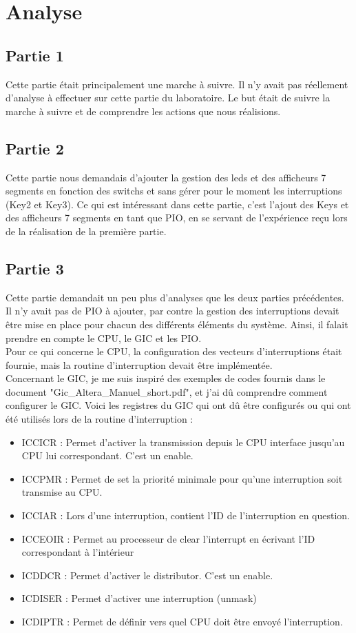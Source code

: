 \section{Analyse}

\subsection{Partie 1}
Cette partie était principalement une marche à suivre. Il n'y avait pas réellement d'analyse à effectuer sur cette partie du laboratoire. Le but était de suivre la marche à suivre et de comprendre les actions que nous réalisions.
\subsection{Partie 2}
Cette partie nous demandais d'ajouter la gestion des leds et des afficheurs 7 segments en fonction des switchs et sans gérer pour le moment les interruptions (Key2 et Key3). Ce qui est intéressant dans cette partie, c'est l'ajout des Keys et des afficheurs 7 segments en tant que PIO, en se servant de l'expérience reçu lors de la réalisation de la première partie.
\subsection{Partie 3}
Cette partie demandait un peu plus d'analyses que les deux parties précédentes. Il n'y avait pas de PIO à ajouter, par contre la gestion des interruptions devait être mise en place pour chacun des différents éléments du système. Ainsi, il falait prendre en compte le CPU, le GIC et les PIO.\\ Pour ce qui concerne le CPU, la configuration des vecteurs d'interruptions était fournie, mais la routine d'interruption devait être implémentée.\\ Concernant le GIC, je me suis inspiré des exemples de codes fournis dans le document "Gic\_Altera\_Manuel\_short.pdf", et j'ai dû comprendre comment configurer le GIC. Voici les registres du GIC qui ont dû être configurés ou qui ont été utilisés lors de la routine d'interruption : \\

\begin{itemize}
	\item ICCICR : Permet d'activer la transmission depuis le CPU interface jusqu'au CPU lui correspondant. C'est un enable.
	\item ICCPMR : Permet de set la priorité minimale pour qu'une interruption soit transmise au CPU.
	\item ICCIAR : Lors d'une interruption, contient l'ID de l'interruption en question.
	\item ICCEOIR : Permet au processeur de clear l'interrupt en écrivant l'ID correspondant à l'intérieur
	\item ICDDCR : Permet d'activer le distributor. C'est un enable.
    \item ICDISER : Permet d'activer une interruption (unmask)
	\item ICDIPTR : Permet de définir vers quel CPU doit être envoyé l'interruption.\\
\end{itemize}

